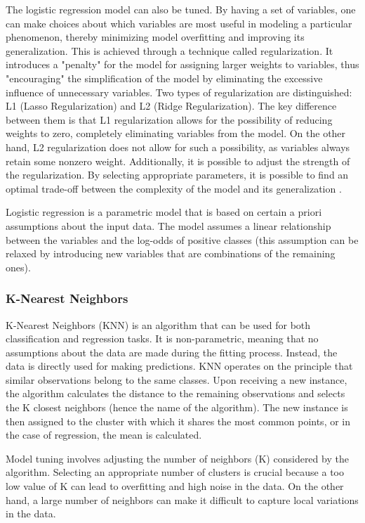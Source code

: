 The logistic regression model can also be tuned. By having a set of variables, one can make choices about which variables are most useful in modeling a particular phenomenon, thereby minimizing model overfitting and improving its generalization. This is achieved through a technique called regularization. It introduces a "penalty" for the model for assigning larger weights to variables, thus "encouraging" the simplification of the model by eliminating the excessive influence of unnecessary variables. Two types of regularization are distinguished: L1 (Lasso Regularization) and L2 (Ridge Regularization). The key difference between them is that L1 regularization allows for the possibility of reducing weights to zero, completely eliminating variables from the model. On the other hand, L2 regularization does not allow for such a possibility, as variables always retain some nonzero weight. Additionally, it is possible to adjust the strength of the regularization. By selecting appropriate parameters, it is possible to find an optimal trade-off between the complexity of the model and its generalization \autocite{Tibshirani1996}.

Logistic regression is a parametric model that is based on certain a priori assumptions about the input data. The model assumes a linear relationship between the variables and the log-odds of positive classes (this assumption can be relaxed by introducing new variables that are combinations of the remaining ones).

\subsubsection{K-Nearest Neighbors}
K-Nearest Neighbors (KNN) is an algorithm that can be used for both classification and regression tasks. It is non-parametric, meaning that no assumptions about the data are made during the fitting process. Instead, the data is directly used for making predictions. KNN operates on the principle that similar observations belong to the same classes. Upon receiving a new instance, the algorithm calculates the distance to the remaining observations and selects the K closest neighbors (hence the name of the algorithm). The new instance is then assigned to the cluster with which it shares the most common points, or in the case of regression, the mean is calculated.

Model tuning involves adjusting the number of neighbors (K) considered by the algorithm. Selecting an appropriate number of clusters is crucial because a too low value of K can lead to overfitting and high noise in the data. On the other hand, a large number of neighbors can make it difficult to capture local variations in the data.

